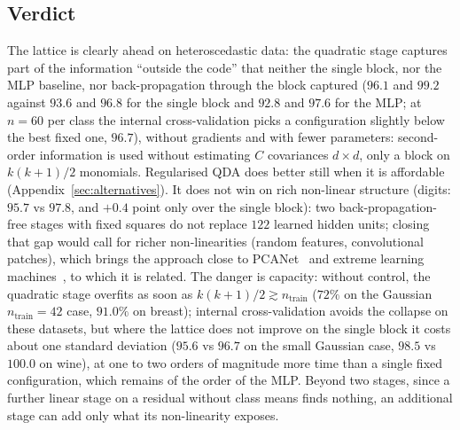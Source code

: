 \documentclass[11pt,a4paper]{article}
\theoremstyle{plain}
\theoremstyle{definition}
\theoremstyle{remark}
\begin{document}
\subsection{Verdict}
The lattice is clearly ahead on heteroscedastic data: the quadratic stage
captures part of the information ``outside the code'' that neither the
single block, nor the MLP baseline, nor back-propagation through the block
captured ($96.1$ and $99.2$ against $93.6$ and $96.8$ for the single block
and $92.8$ and $97.6$ for the MLP; at $n=60$ per class the internal
cross-validation picks a configuration slightly below the best fixed one,
$96.7$),
without gradients and with fewer parameters: second-order information is used
without estimating $C$ covariances $d\times d$, only a block on $k(k+1)/2$
monomials. Regularised QDA does better still when it is affordable
(Appendix~\ref{sec:alternatives}). It does not win on rich non-linear structure (digits: $95.7$ vs
$97.8$, and $+0.4$ point only over the single block): two back-propagation-free stages with fixed squares do not replace $122$
learned hidden units; closing that gap would call for richer
non-linearities (random features, convolutional patches), which brings the
approach close to PCANet~\cite{chan2015pcanet} and extreme learning
machines~\cite{huang2006elm}, to which it is related. The danger is capacity: without control, the quadratic
stage overfits as soon as $k(k+1)/2\gtrsim n_{\mathrm{train}}$ ($72\%$ on the
Gaussian $n_{\mathrm{train}}=42$ case, $91.0\%$ on breast); internal
cross-validation avoids the collapse on these datasets, but where the
lattice does not improve on the single block it costs about one standard
deviation ($95.6$ vs $96.7$ on the small Gaussian case, $98.5$ vs $100.0$
on wine), at one to two orders of magnitude more time than a single fixed
configuration, which remains of the order of the MLP.
Beyond two stages, since a further linear stage on a residual without class
means finds nothing, an additional stage can add only what its
non-linearity exposes.
\end{document}
